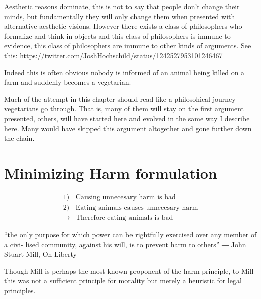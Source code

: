 \documentclass[12pt]{report}
\numberwithin{equation}{section}
\begin{document}
Aesthetic reasons dominate, this is not to say that people don't change their minds, but fundamentally they will only change them when presented with alternative aesthetic visions. However there exists a class of philosophers who formalize and think in objects and this class of philosophers is immune to evidence, this class of philosophers are immune to other kinds of arguments.
See this: https://twitter.com/JoshHochschild/status/1242527953101246467

Indeed this is often obvious nobody is informed of an animal being killed on a farm and suddenly becomes a vegetarian.

Much of the attempt in this chapter should read like a philosohical journey vegetarians go through. That is, many of them will stay on the first argument presented, others, will have started here and evolved in the same way I describe here. Many would have skipped this argument altogether and gone further down the chain. 

\section{Minimizing Harm formulation}


\begin{tcolorbox}[enhanced,%
  colback=green!25!black!10!white,colframe=green!75!black,title=Fit box (5cm),
  drop fuzzy shadow,watermark color=white,watermark text=Fit]
\begin{align*}
1)& \text{Causing unnecesary harm is bad} \\
2)& \text{Eating animals causes unnecesary harm} \\
\rightarrow& \text{Therefore eating animals is bad}
\end{align*}
\end{tcolorbox}


\begin{tcolorbox}[enhanced,%
  colback=green!25!black!10!white,colframe=green!75!black,title=Principle of utility (10cm),
  drop fuzzy shadow,watermark color=white,watermark text=Fit]
“the only purpose for which power can be rightfully exercised over any member of a civi- lised community, against his will, is to prevent harm to others”
― John Stuart Mill, On Liberty
\end{tcolorbox}


Though Mill is perhaps the most known proponent of the harm principle, to Mill this was not a sufficient principle for morality but merely a heuristic for legal principles. 
\end{document}
